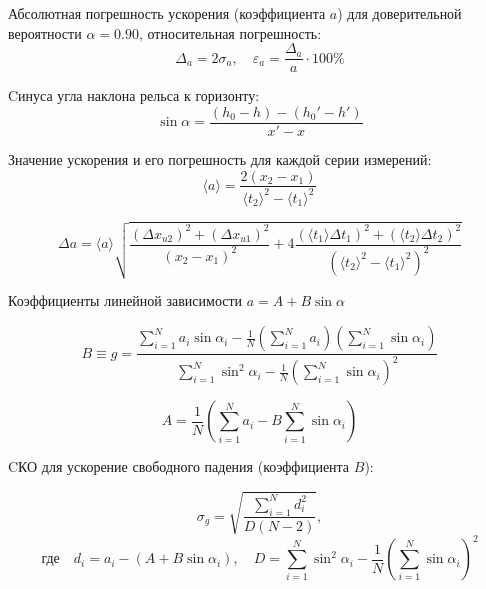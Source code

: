 \documentclass[14pt]{extreport}
\begin{document}
Абсолютная погрешность ускорения (коэффициента $a$) для доверительной вероятности $\alpha = 0.90$, относительная погрешность:
\begin{equation*}
    \Delta_a=2\sigma_a, \quad \varepsilon_a=\frac{\Delta_a}{a}\cdot100\%
\end{equation*}

Cинуса угла наклона рельса к горизонту:
\begin{equation*}
    \sin{\alpha} = \frac{(h_0 - h) - (h_0' - h')}{x'-x}
\end{equation*}

Значение ускорения и его погрешность для каждой серии измерений:
\begin{equation*}
    \langle a \rangle = \frac{2(x_2 - x_1)}{{\langle t_2 \rangle}^2 - {\langle t_1 \rangle}^2}
\end{equation*}

\begin{equation*}
\Delta a = \langle a\rangle \sqrt{
    \frac{(\Delta x_{u2})^2 + (\Delta x_{u1})^2}{(x_2 - x_1)^2} + 
    4\frac{(\langle t_1\rangle \Delta t_1)^2 + (\langle t_2\rangle \Delta t_2)^2}{(\langle t_2\rangle^2 - \langle t_1\rangle^2)^2}
}
\end{equation*}

Коэффициенты линейной зависимости $a = A + B \sin{\alpha}$

\begin{equation*}
B \equiv g = \frac{
    \sum\limits_{i=1}^N a_i \sin\alpha_i - \frac{1}{N}\left(\sum\limits_{i=1}^N a_i\right)\left(\sum\limits_{i=1}^N \sin\alpha_i\right)
}{
    \sum\limits_{i=1}^N \sin^2\alpha_i - \frac{1}{N}\left(\sum\limits_{i=1}^N \sin\alpha_i\right)^2
}
\end{equation*}

\begin{equation*}
A = \frac{1}{N}\left(\sum_{i=1}^N a_i - B\sum_{i=1}^N \sin\alpha_i\right)
\end{equation*}

CКО для ускорение свободного падения (коэффициента $B$):

\begin{equation*}
\sigma_g = \sqrt{\frac{\sum_{i=1}^N d_i^2}{D(N-2)}},
\end{equation*}
\begin{equation*}
\text{где} \quad
d_i = a_i - (A + B \sin \alpha_i),
\quad
D = \sum_{i=1}^N \sin^2\alpha_i - \frac{1}{N} \left( \sum_{i=1}^N \sin\alpha_i \right)^2
\end{equation*}
\end{document}
